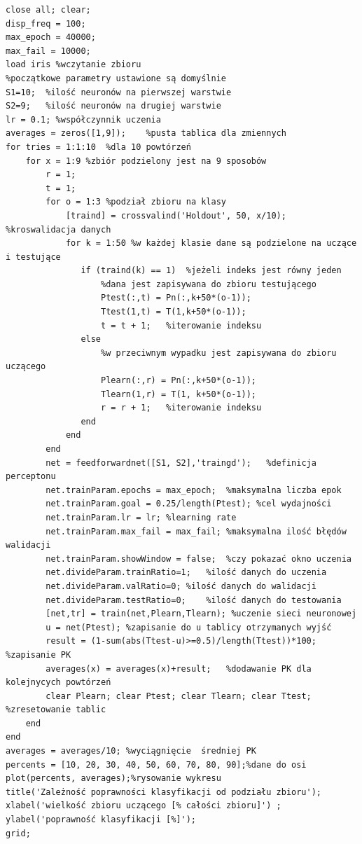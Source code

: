 \documentclass[a4paper, 12pt]{article}
\begin{document}
\newpage
\begin{lstlisting}[frame=single, caption=Skrypt do analizy dotyczącej wpływu podziału danych na uczenie sieci]
%wyczyszczenia środowiska i ustawienie wartości początkowych
close all; clear;
disp_freq = 100;
max_epoch = 40000;
max_fail = 10000;
load iris %wczytanie zbioru
%początkowe parametry ustawione są domyślnie
S1=10;  %ilość neuronów na pierwszej warstwie
S2=9;   %ilość neuronów na drugiej warstwie
lr = 0.1; %współczynnik uczenia
averages = zeros([1,9]);    %pusta tablica dla zmiennych
for tries = 1:1:10  %dla 10 powtórzeń
    for x = 1:9 %zbiór podzielony jest na 9 sposobów
        r = 1;
        t = 1;
        for o = 1:3 %podział zbioru na klasy
            [traind] = crossvalind('Holdout', 50, x/10);    %kroswalidacja danych
            for k = 1:50 %w każdej klasie dane są podzielone na uczące i testujące
               if (traind(k) == 1)  %jeżeli indeks jest równy jeden
                   %dana jest zapisywana do zbioru testującego
                   Ptest(:,t) = Pn(:,k+50*(o-1));
                   Ttest(1,t) = T(1,k+50*(o-1));
                   t = t + 1;   %iterowanie indeksu
               else
                   %w przeciwnym wypadku jest zapisywana do zbioru uczącego
                   Plearn(:,r) = Pn(:,k+50*(o-1));
                   Tlearn(1,r) = T(1, k+50*(o-1));
                   r = r + 1;   %iterowanie indeksu
               end
            end
        end
        net = feedforwardnet([S1, S2],'traingd');   %definicja perceptonu
        net.trainParam.epochs = max_epoch;  %maksymalna liczba epok
        net.trainParam.goal = 0.25/length(Ptest); %cel wydajności
        net.trainParam.lr = lr; %learning rate
        net.trainParam.max_fail = max_fail; %maksymalna ilość błędów walidacji
        net.trainParam.showWindow = false;  %czy pokazać okno uczenia
        net.divideParam.trainRatio=1;   %ilość danych do uczenia
        net.divideParam.valRatio=0; %ilość danych do walidacji
        net.divideParam.testRatio=0;    %ilość danych do testowania
        [net,tr] = train(net,Plearn,Tlearn); %uczenie sieci neuronowej
        u = net(Ptest); %zapisanie do u tablicy otrzymanych wyjść
        result = (1-sum(abs(Ttest-u)>=0.5)/length(Ttest))*100;  %zapisanie PK
        averages(x) = averages(x)+result;   %dodawanie PK dla kolejnycych powtórzeń
        clear Plearn; clear Ptest; clear Tlearn; clear Ttest; %zresetowanie tablic
    end
end
averages = averages/10; %wyciągnięcie  średniej PK
percents = [10, 20, 30, 40, 50, 60, 70, 80, 90];%dane do osi
plot(percents, averages);%rysowanie wykresu
title('Zależność poprawności klasyfikacji od podziału zbioru');
xlabel('wielkość zbioru uczącego [% całości zbioru]') ;
ylabel('poprawność klasyfikacji [%]');
grid;
\end{lstlisting}
\end{document}
